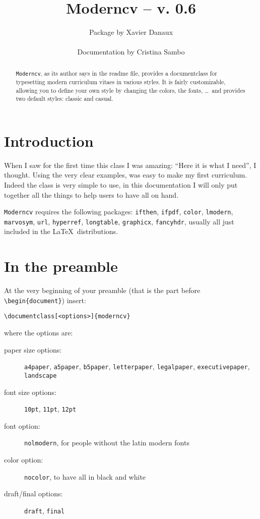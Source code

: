\documentclass[a4paper,11pt,draft]{article}
\title{\bfseries Moderncv -- v. 0.6}
\author{Package by Xavier Danaux \\ \begin{small}Documentation by Cristina Sambo \end{small}}
\date{}
\begin{document}
\maketitle

\begin{abstract}
\noindent \texttt{Moderncv}, as its author says in the readme file, provides a documentclass for typesetting modern curriculum vitaes in various styles. It is fairly customizable, allowing you to define your own style by changing the colors, the fonts, \dots\ and provides two default styles: classic and casual.
\end{abstract}

\section{Introduction}
When I saw for the first time this class I was amazing: ``Here it is what I need'', I thought. Using the very clear examples, was easy to make my first curriculum. 
Indeed the class is very simple to use, in this documentation I will only put together all the things to help users to have all on hand.

\smallskip
\texttt{Moderncv} requires the following packages: \texttt{ifthen}, \texttt{ifpdf}, \texttt{color}, \texttt{lmodern}, \texttt{marvosym}, \texttt{url}, \texttt{hyperref}, \texttt{longtable}, \texttt{graphicx}, \texttt{fancyhdr}, usually all just included in the \LaTeX\ distributions.

\section{In the preamble}

At the very beginning of your preamble (that is the part before \verb|\begin{document}|) insert:

\begin{verbatim}
\documentclass[<options>]{moderncv}
\end{verbatim} 

where the options are:

\begin{description}
 \item[paper size options:] \texttt{a4paper}, \texttt{a5paper}, \texttt{b5paper}, \texttt{letterpaper}, \texttt{legalpaper}, \texttt{ex\-ec\-u\-tive\-pa\-per}, \texttt{landscape}
 \item[font size options:] \texttt{10pt}, \texttt{11pt}, \texttt{12pt}
 \item[font option:] \texttt{nolmodern}, for people without the latin modern fonts
 \item[color option:] \texttt{nocolor}, to have all in black and white
 \item[draft/final options:] \texttt{draft}, \texttt{final}
\end{description}
\end{document}
